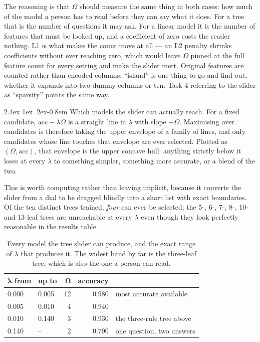 \documentclass[11pt,a4paper]{article}
\makeatletter
\renewcommand\paragraph{\@startsection{paragraph}{4}{\z@}%
  {2.4ex \@plus1ex \@minus.2ex}{-0.8em}%
  {\normalfont\normalsize\sffamily\bfseries\color{code}}}
\makeatother
\begin{document}
The reasoning is that $\Omega$ should measure the same thing in both cases: how
much of the model a person has to read before they can say what it does. For a
tree that is the number of questions it may ask. For a linear model it is the
number of features that must be looked up, and a coefficient of zero costs the
reader nothing. L1 is what makes the count move at all --- an L2 penalty shrinks
coefficients without ever reaching zero, which would leave $\Omega$ pinned at the
full feature count for every setting and make the slider inert. Original features
are counted rather than encoded columns: ``island'' is one thing to go and find
out, whether it expands into two dummy columns or ten. Task 4 referring to the
slider as ``sparsity'' points the same way.

\paragraph{Which models the slider can actually reach.} For a fixed candidate,
$\mathrm{acc} - \lambda\Omega$ is a straight line in $\lambda$ with slope
$-\Omega$. Maximising over candidates is therefore taking the upper envelope of a
family of lines, and only candidates whose line touches that envelope are ever
selected. Plotted as $(\Omega, \mathrm{acc})$, that envelope is the upper concave
hull: anything strictly below it loses at every $\lambda$ to something simpler,
something more accurate, or a blend of the two.

This is worth computing rather than leaving implicit, because it converts the
slider from a dial to be dragged blindly into a short list with exact
boundaries. Of the ten distinct trees trained, \emph{four} can ever be selected;
the 5-, 6-, 7-, 8-, 10- and 13-leaf trees are unreachable at every $\lambda$ even
though they look perfectly reasonable in the results table.

\begin{table}[H]
\centering
\small
\begin{tabular}{@{}llrrl@{}}
\toprule
$\boldsymbol{\lambda}$ \textbf{from} & \textbf{up to} & $\boldsymbol{\Omega}$ & \textbf{accuracy} & \\
\midrule
0.000 & 0.005 & 12 & 0.980 & most accurate available \\
0.005 & 0.010 & 4  & 0.940 & \\
0.010 & 0.140 & 3  & 0.930 & the three-rule tree above \\
0.140 & --    & 2  & 0.790 & one question, two answers \\
\bottomrule
\end{tabular}
\caption{Every model the tree slider can produce, and the exact range of
$\lambda$ that produces it. The widest band by far is the three-leaf tree, which
is also the one a person can read.}
\label{tab:p2-bands}
\end{table}
\end{document}
